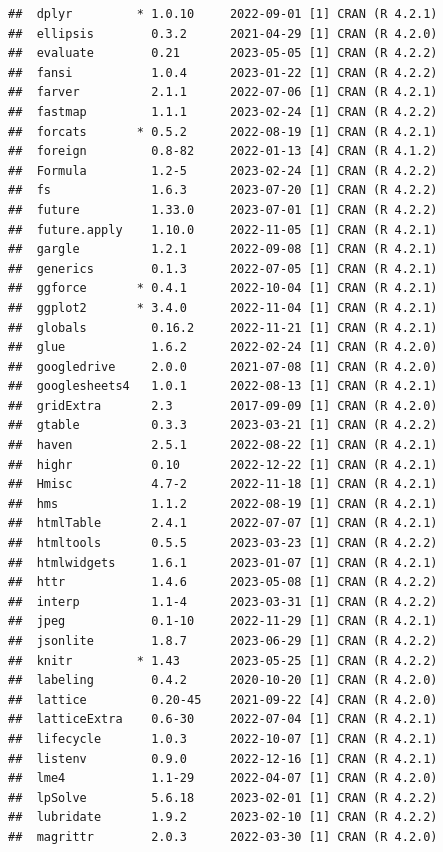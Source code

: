 \documentclass[
]{article}
\begin{document}
\begin{verbatim}
##  dplyr         * 1.0.10     2022-09-01 [1] CRAN (R 4.2.1)
##  ellipsis        0.3.2      2021-04-29 [1] CRAN (R 4.2.0)
##  evaluate        0.21       2023-05-05 [1] CRAN (R 4.2.2)
##  fansi           1.0.4      2023-01-22 [1] CRAN (R 4.2.2)
##  farver          2.1.1      2022-07-06 [1] CRAN (R 4.2.1)
##  fastmap         1.1.1      2023-02-24 [1] CRAN (R 4.2.2)
##  forcats       * 0.5.2      2022-08-19 [1] CRAN (R 4.2.1)
##  foreign         0.8-82     2022-01-13 [4] CRAN (R 4.1.2)
##  Formula         1.2-5      2023-02-24 [1] CRAN (R 4.2.2)
##  fs              1.6.3      2023-07-20 [1] CRAN (R 4.2.2)
##  future          1.33.0     2023-07-01 [1] CRAN (R 4.2.2)
##  future.apply    1.10.0     2022-11-05 [1] CRAN (R 4.2.1)
##  gargle          1.2.1      2022-09-08 [1] CRAN (R 4.2.1)
##  generics        0.1.3      2022-07-05 [1] CRAN (R 4.2.1)
##  ggforce       * 0.4.1      2022-10-04 [1] CRAN (R 4.2.1)
##  ggplot2       * 3.4.0      2022-11-04 [1] CRAN (R 4.2.1)
##  globals         0.16.2     2022-11-21 [1] CRAN (R 4.2.1)
##  glue            1.6.2      2022-02-24 [1] CRAN (R 4.2.0)
##  googledrive     2.0.0      2021-07-08 [1] CRAN (R 4.2.0)
##  googlesheets4   1.0.1      2022-08-13 [1] CRAN (R 4.2.1)
##  gridExtra       2.3        2017-09-09 [1] CRAN (R 4.2.0)
##  gtable          0.3.3      2023-03-21 [1] CRAN (R 4.2.2)
##  haven           2.5.1      2022-08-22 [1] CRAN (R 4.2.1)
##  highr           0.10       2022-12-22 [1] CRAN (R 4.2.1)
##  Hmisc           4.7-2      2022-11-18 [1] CRAN (R 4.2.1)
##  hms             1.1.2      2022-08-19 [1] CRAN (R 4.2.1)
##  htmlTable       2.4.1      2022-07-07 [1] CRAN (R 4.2.1)
##  htmltools       0.5.5      2023-03-23 [1] CRAN (R 4.2.2)
##  htmlwidgets     1.6.1      2023-01-07 [1] CRAN (R 4.2.1)
##  httr            1.4.6      2023-05-08 [1] CRAN (R 4.2.2)
##  interp          1.1-4      2023-03-31 [1] CRAN (R 4.2.2)
##  jpeg            0.1-10     2022-11-29 [1] CRAN (R 4.2.1)
##  jsonlite        1.8.7      2023-06-29 [1] CRAN (R 4.2.2)
##  knitr         * 1.43       2023-05-25 [1] CRAN (R 4.2.2)
##  labeling        0.4.2      2020-10-20 [1] CRAN (R 4.2.0)
##  lattice         0.20-45    2021-09-22 [4] CRAN (R 4.2.0)
##  latticeExtra    0.6-30     2022-07-04 [1] CRAN (R 4.2.1)
##  lifecycle       1.0.3      2022-10-07 [1] CRAN (R 4.2.1)
##  listenv         0.9.0      2022-12-16 [1] CRAN (R 4.2.1)
##  lme4            1.1-29     2022-04-07 [1] CRAN (R 4.2.0)
##  lpSolve         5.6.18     2023-02-01 [1] CRAN (R 4.2.2)
##  lubridate       1.9.2      2023-02-10 [1] CRAN (R 4.2.2)
##  magrittr        2.0.3      2022-03-30 [1] CRAN (R 4.2.0)

\end{verbatim}
\end{document}
